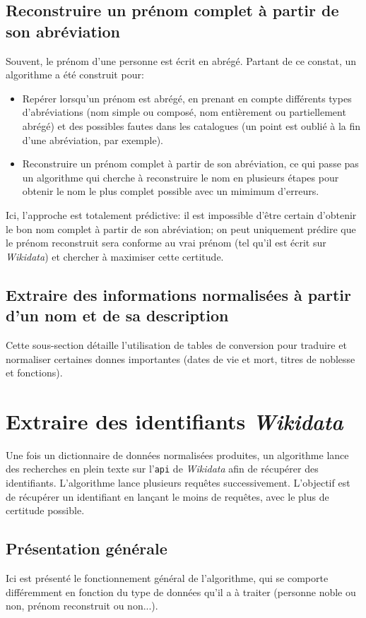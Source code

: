 \documentclass[a4paper, 12pt, twoside]{book}
\newcommand{\api}{\texttt{\gls{api}}}
\newcommand{\wkd}{\textit{Wikidata}}
\begin{document}
\subsection{Reconstruire un prénom complet à partir de son abréviation}
Souvent, le prénom d'une personne est écrit en abrégé. Partant de ce constat, un algorithme a été construit pour:
\begin{itemize}
	\item Repérer lorsqu'un prénom est abrégé, en prenant en compte différents types d'abréviations (nom simple ou composé, nom entièrement ou partiellement abrégé) et des possibles fautes dans les catalogues (un point est oublié à la fin d'une abréviation, par exemple).
	\item Reconstruire un prénom complet à partir de son abréviation, ce qui passe pas un algorithme qui cherche à reconstruire le nom en plusieurs étapes pour obtenir le nom le plus complet possible avec un mimimum d'erreurs.
\end{itemize}

Ici, l'approche est totalement prédictive: il est impossible d'être certain d'obtenir le bon nom complet à partir de son abréviation; on peut uniquement prédire que le prénom reconstruit sera conforme au vrai prénom (tel qu'il est écrit sur \wkd{}) et chercher à maximiser cette certitude.

\subsection{Extraire des informations normalisées à partir d'un nom et de sa description}
Cette sous-section détaille l'utilisation de tables de conversion pour traduire et normaliser certaines donnes importantes (dates de vie et mort, titres de noblesse et fonctions).

\section{Extraire des identifiants \wkd{}}
Une fois un dictionnaire de données normalisées produites, un algorithme lance des recherches en plein texte sur l'\api{} de \wkd{} afin de récupérer des identifiants. L'algorithme lance plusieurs requêtes successivement. L'objectif est de récupérer un identifiant en lançant le moins de requêtes, avec le plus de certitude possible.

\subsection{Présentation générale}
Ici est présenté le fonctionnement général de l'algorithme, qui se comporte différemment en fonction du type de données qu'il a à traiter (personne noble ou non, prénom reconstruit ou non...).
\end{document}
